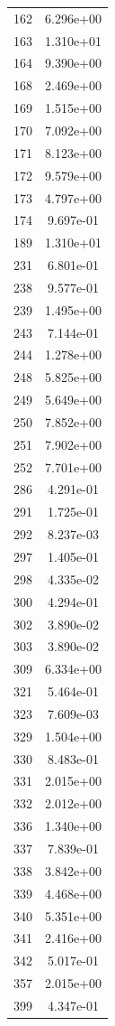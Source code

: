 \documentclass[12pt]{article}
\begin{document}
\begin{longtable}{@{}cc@{}}
162 & 6.296e+00 \\
163 & 1.310e+01 \\
164 & 9.390e+00 \\
168 & 2.469e+00 \\
169 & 1.515e+00 \\
170 & 7.092e+00 \\
171 & 8.123e+00 \\
172 & 9.579e+00 \\
173 & 4.797e+00 \\
174 & 9.697e-01 \\
189 & 1.310e+01 \\
231 & 6.801e-01 \\
238 & 9.577e-01 \\
239 & 1.495e+00 \\
243 & 7.144e-01 \\
244 & 1.278e+00 \\
248 & 5.825e+00 \\
249 & 5.649e+00 \\
250 & 7.852e+00 \\
251 & 7.902e+00 \\
252 & 7.701e+00 \\
286 & 4.291e-01 \\
291 & 1.725e-01 \\
292 & 8.237e-03 \\
297 & 1.405e-01 \\
298 & 4.335e-02 \\
300 & 4.294e-01 \\
302 & 3.890e-02 \\
303 & 3.890e-02 \\
309 & 6.334e+00 \\
321 & 5.464e-01 \\
323 & 7.609e-03 \\
329 & 1.504e+00 \\
330 & 8.483e-01 \\
331 & 2.015e+00 \\
332 & 2.012e+00 \\
336 & 1.340e+00 \\
337 & 7.839e-01 \\
338 & 3.842e+00 \\
339 & 4.468e+00 \\
340 & 5.351e+00 \\
341 & 2.416e+00 \\
342 & 5.017e-01 \\
357 & 2.015e+00 \\
399 & 4.347e-01 \\

\end{longtable}
\end{document}
